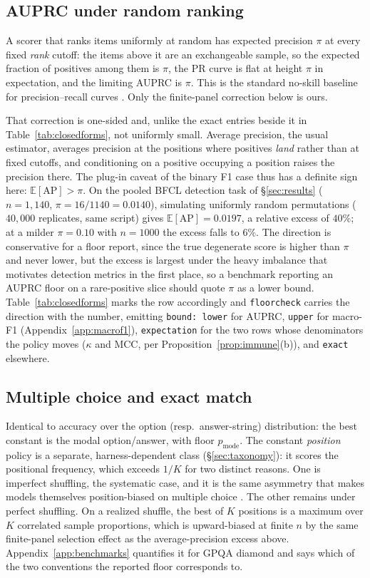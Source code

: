 \documentclass{article}
\theoremstyle{plain}
\theoremstyle{definition}
\newcommand{\floorcheck}{\texttt{floorcheck}}
\begin{document}
\subsection{AUPRC under random ranking}
A scorer that ranks items uniformly at random has expected precision $\pi$ at every fixed \emph{rank} cutoff: the items above it are an exchangeable sample, so the expected fraction of positives among them is $\pi$, the PR curve is flat at height $\pi$ in expectation, and the limiting AUPRC is $\pi$. This is the standard no-skill baseline for precision--recall curves \citep{saito2015prc}. Only the finite-panel correction below is ours.

That correction is one-sided and, unlike the exact entries beside it in Table~\ref{tab:closedforms}, not uniformly small. Average precision, the usual estimator, averages precision at the positions where positives \emph{land} rather than at fixed cutoffs, and conditioning on a positive occupying a position raises the precision there. The plug-in caveat of the binary F1 case thus has a definite sign here: $\mathbb{E}[\mathrm{AP}] > \pi$. On the pooled BFCL detection task of \S\ref{sec:results} ($n = 1{,}140$, $\pi = 16/1140 = 0.0140$), simulating uniformly random permutations ($40{,}000$ replicates, same script) gives $\mathbb{E}[\mathrm{AP}] = 0.0197$, a relative excess of $40\%$; at a milder $\pi = 0.10$ with $n = 1000$ the excess falls to $6\%$. The direction is conservative for a floor report, since the true degenerate score is higher than $\pi$ and never lower, but the excess is largest under the heavy imbalance that motivates detection metrics in the first place, so a benchmark reporting an AUPRC floor on a rare-positive slice should quote $\pi$ as a lower bound. Table~\ref{tab:closedforms} marks the row accordingly and \floorcheck{} carries the direction with the number, emitting \texttt{bound: lower} for AUPRC, \texttt{upper} for macro-F1 (Appendix~\ref{app:macrof1}), \texttt{expectation} for the two rows whose denominators the policy moves ($\kappa$ and MCC, per Proposition~\ref{prop:immune}(b)), and \texttt{exact} elsewhere.

\subsection{Multiple choice and exact match}
Identical to accuracy over the option (resp.\ answer-string) distribution: the best constant is the modal option/answer, with floor $p_{\mathrm{mode}}$. The constant \emph{position} policy is a separate, harness-dependent class (\S\ref{sec:taxonomy}): it scores the positional frequency, which exceeds $1/K$ for two distinct reasons. One is imperfect shuffling, the systematic case, and it is the same asymmetry that makes models themselves position-biased on multiple choice \citep{zheng2024selectors}. The other remains under perfect shuffling. On a realized shuffle, the best of $K$ positions is a maximum over $K$ correlated sample proportions, which is upward-biased at finite $n$ by the same finite-panel selection effect as the average-precision excess above. Appendix~\ref{app:benchmarks} quantifies it for GPQA diamond and says which of the two conventions the reported floor corresponds to.
\end{document}
